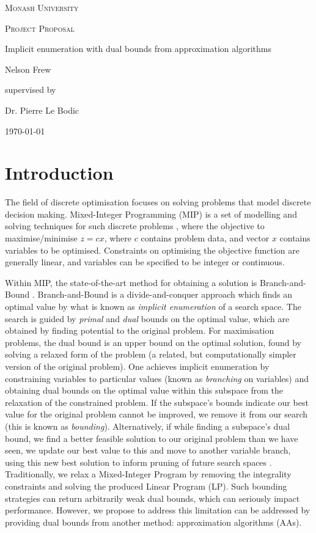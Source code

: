\documentclass[12pt, a4paper]{article}
\begin{document}
\begin{titlepage}
  \centering
  {\scshape\LARGE Monash University \par}
  \vspace{1cm}
  {\scshape\Large Project Proposal \par}
  \vspace{1.5cm}
  {\huge Implicit enumeration with dual bounds from approximation algorithms\par}
  \vspace{2cm}
  {\Large Nelson Frew\par}
  \vfill
  supervised by\par
  Dr. Pierre Le Bodic
  \vfill
  {\large \today\par}
\end{titlepage}
\tableofcontents
\newpage
\section{Introduction}
The field of discrete optimisation \cite{Hammer} focuses on solving problems that model discrete decision making. Mixed-Integer Programming (MIP) is a set of modelling and solving techniques for such discrete problems \cite{WolseyMIP}, where the objective to maximise/minimise $z = c x$, where $c$ contains problem data, and vector $x$ contains variables to be optimised. Constraints on optimising the objective function are generally linear, and variables can be specified to be integer or continuous. \cite{BOOK:1}

Within MIP, the state-of-the-art method for obtaining a solution is Branch-and-Bound \cite{Mitten}. Branch-and-Bound is a divide-and-conquer approach which finds an optimal value by what is known as \emph{implicit enumeration} of a search space. The search is guided by \emph{primal} and \emph{dual} bounds on the optimal value, which are obtained by finding potential to the original problem. For maximisation problems, the dual bound is an upper bound on the optimal solution, found by solving a relaxed form of the problem (a related, but computationally simpler version of the original problem). One achieves implicit enumeration by constraining variables to particular values (known as \emph{branching} on variables) and obtaining dual bounds on the optimal value within this subspace from the relaxation of the constrained problem. If the subspace's bounds indicate our best value for the original problem cannot be improved, we remove it from our search (this is known as \emph{bounding}). Alternatively, if while finding a subspace's dual bound, we find a better feasible solution to our original problem than we have seen, we update our best value to this and move to another variable branch, using this new best solution to inform pruning of future search spaces \cite{Gomory}. Traditionally, we relax a Mixed-Integer Program by removing the integrality constraints and solving the produced Linear Program (LP). Such bounding strategies can return arbitrarily weak dual bounds, which can seriously impact performance. However, we propose to address this limitation can be addressed by providing dual bounds from another method: approximation algorithms (AAs).  
\end{document}
